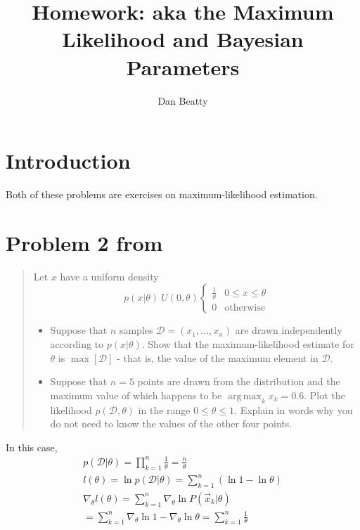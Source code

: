 \documentclass[11pt]{article}
\title{Homework: aka the Maximum Likelihood and Bayesian Parameters}
\author{Dan Beatty}
\DeclareMathOperator*{\argmax}{arg\,max}
\begin{document}
\maketitle


\section{Introduction}
Both of these problems are exercises on maximum-likelihood estimation.

\section{Problem 2 from \cite[140-141]{duda-hart-stork}}
\begin{quote}
Let $x$ have a uniform density
\begin{equation} 
p(x | \theta) ~ U(0, \theta)
	\left\{
	\begin{array}{ll}
		\frac{1}{\theta} & 0 \le x \le \theta \\
		0	& \textrm{otherwise}
	\end{array}
	\right.
\end{equation}
\begin{itemize}
	\item Suppose that $n$ samples $\mathcal{D} = (x_1, ..., x_n)$ are drawn independently according to $p(x | \theta)$.  Show that the maximum-likelihood estimate for $\theta$ is $\max [\mathcal{D}]$ - that is, the value of the maximum element in $\mathcal{D}$.
	\item Suppose that $n=5$ points are drawn from the distribution and the maximum value of which happens to be $ \argmax _{k} x_k = 0.6$.  Plot the likelihood $p(\mathcal{D}, \theta)$ in the range $0 \le \theta \le 1$.  Explain in words why you do not need to know the values of the other four points.  
\end{itemize}

\end{quote}


In this case, 
\begin{eqnarray}
p(\mathcal{D} | \theta) = \prod _{k=1}^{n} \frac{1}{\theta} = \frac{n}{\theta} \\
l (\theta) = \ln p(\mathcal{D}| \theta) = \sum_{k=1}^n (\ln 1 - \ln \theta) \\
\nabla _{\theta} l(\theta) = \sum _{k=1}^{n} \nabla _{\theta} \ln P(\vec{x}_k | \theta) \\
= \sum_{k=1}^n \nabla_{\theta} \ln 1 -  \nabla_{\theta} \ln \theta  = \sum_{k=1}^n \frac{1}{\theta}
\end{eqnarray}
\end{document}
